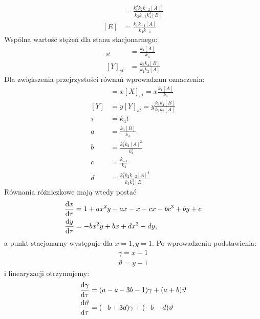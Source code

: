 \documentclass[10pt, a4paper, twoside, onecolumn]{article}
\numberwithin{equation}{section}
\begin{document}
	\begin{align}
		[D] &= \frac{k_{1}^{4}k_{2}k_{-2}[A]^{4}}{k_{3}k_{-3}k_{4}^{4}[B]} \\
		[E] &= \frac{k_{1}k_{-1}[A]}{k_{4}k_{-4}}
	\end{align}
	Wspólna wartość stężeń dla stanu stacjonarnego:
	\begin{align}
		[X]_{st} &= \frac{k_{1}[A]}{k_{4}} \\
		[Y]_{st} &= \frac{k_{3}k_{4}[B]}{k_{1}k_{2}[A]}
	\end{align}
	Dla zwiększenia przejrzystości równań wprowadzam oznaczenia: 
	\begin{align}
		[X] &= x[X]_{st} = x\frac{k_{1}[A]}{k_{4}} \\
		[Y] &= y[Y]_{st} = y\frac{k_{3}k_{4}[B]}{k_{1}k_{2}[A]} \\
		\tau &= k_{4}t \\
		a &= \frac{k_{3}[B]}{k_{4}} \\
		b &= \frac{k_{1}^{2}k_{2}[A]^{2}}{k_{4}^{3}} \\
		c &= \frac{k_{-1}}{k_{4}} \\
		d &= \frac{k_{1}^{4}k_{2}k_{-2}[A]^{4}}{k_{3}k_{4}^{5}[B]}
	\end{align}
	Równania różniczkowe mają wtedy postać
	\begin{align}
		\dv{x}{\tau} &= 1 + ax^{2}y - ax - x - cx - bc^{3} + by + c \\
		\dv{y}{\tau} &= -bx^{2}y + bx + dx^{3} - dy, 
	\end{align}
	a punkt stacjonarny występuje dla \(x=1, y=1\). 
	Po wprowadzeniu podstawienia:
	\begin{gather*}
		\gamma = x - 1 \\
		\vartheta = y - 1
	\end{gather*}
	i linearyzacji otrzymujemy:
	\begin{align}
		\dv{\gamma}{\tau} &= (a - c - 3b - 1)\gamma + (a + b)\vartheta \\
		\dv{\vartheta}{\tau} &= (- b + 3d)\gamma + (- b - d)\vartheta
	\end{align}
\end{document}
